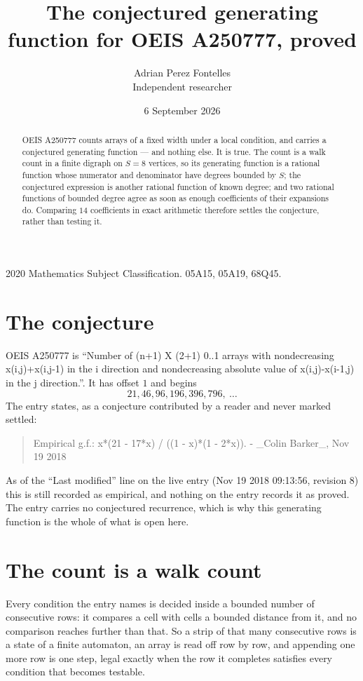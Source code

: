 \documentclass[11pt,a4paper]{article}
\title{The conjectured generating function for OEIS A250777, proved}
\author{Adrian Perez Fontelles\\ \small Independent researcher}
\date{6 September 2026}
\theoremstyle{plain}
\theoremstyle{definition}
\begin{document}
\maketitle

\begin{abstract}
OEIS A250777 counts arrays of a fixed width under a local condition, and carries a conjectured
generating function --- and nothing else. It is true. The count is a walk count in a finite
digraph on $S=8$ vertices, so its generating function is a rational function whose numerator
and denominator have degrees bounded by $S$; the conjectured expression is another rational
function of known degree; and two rational functions of bounded degree agree as soon as enough
coefficients of their expansions do. Comparing $14$ coefficients in exact arithmetic
therefore settles the conjecture, rather than testing it.
\end{abstract}

\noindent\small 2020 Mathematics Subject Classification. 05A15, 05A19, 68Q45.\normalsize

\section{The conjecture}

OEIS A250777 is ``Number of (n+1) X (2+1) 0..1 arrays with nondecreasing x(i,j)+x(i,j-1) in the i direction and nondecreasing absolute value of x(i,j)-x(i-1,j) in the j direction.''. It has offset $1$ and begins
\[
21, 46, 96, 196, 396, 796,\ \dots
\]
The entry states, as a conjecture contributed by a reader and never marked settled:
\begin{quote}
Empirical g.f.: x*(21 - 17*x) / ((1 - x)*(1 - 2*x)). - \_Colin Barker\_, Nov 19 2018
\end{quote}
As of the ``Last modified'' line on the live entry (Nov 19 2018 09:13:56, revision 8) this is still
recorded as empirical, and nothing on the entry records it as proved. The entry carries no
conjectured recurrence, which is why this generating function is the whole of what is open
here.

\section{The count is a walk count}

Every condition the entry names is decided inside a bounded number of consecutive rows: it
compares a cell with cells a bounded distance from it, and no comparison reaches further than
that. So a strip of that many consecutive rows is a state of a finite automaton, an array is
read off row by row, and appending one more row is one step, legal exactly when the row it
completes satisfies every condition that becomes testable.
\end{document}
